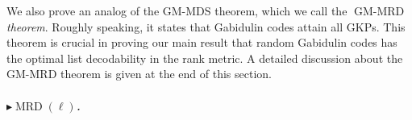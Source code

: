 \documentclass[11pt]{article}
\newif\ifmynotes
\newcommand{\CYnote}[1]{\ifmynotes\textcolor{orange}{[Chen: #1]}\else\fi}
\newcommand{\ZZnote}[1]{\ifmynotes\textcolor{violet}{[Zihan: #1]}\else\fi}
\theoremstyle{plain}
\newtheorem{thm}{Theorem}[section]
\theoremstyle{definition}
\theoremstyle{remark}
\newcommand{\F}{\mathbb{F}}
\def \mG {\mathcal{G}}
\begin{document}
We also prove an analog of the GM-MDS theorem, which we call the \emph{$\operatorname{GM-MRD}$ theorem}. Roughly speaking, it states that Gabidulin codes attain all GKPs. This theorem is crucial in proving our main result that random Gabidulin codes has the optimal list decodability in the rank metric. A detailed discussion about the GM-MRD theorem is given at the end of this section. 

\subparagraph{$\blacktriangleright\operatorname{MRD}(\ell)$.} 
\end{document}

